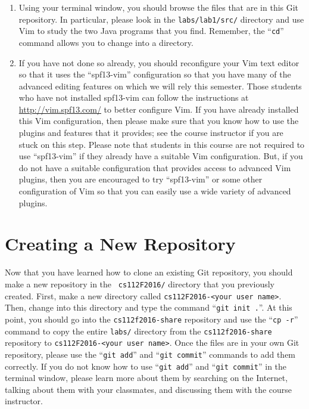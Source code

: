 \begin{enumerate}
\item Using your terminal window, you should browse the files that are in this Git repository.  In particular, please
  look in the {\tt labs/lab1/src/} directory and use Vim to study the two Java programs that you find.  Remember, the
  ``{\tt cd}'' command allows you to change into a directory.

\item If you have not done so already, you should reconfigure your Vim text editor so that it uses the ``spf13-vim''
  configuration so that you have many of the advanced editing features on which we will rely this semester. Those
  students who have not installed spf13-vim can follow the instructions at \url{http://vim.spf13.com/} to better
  configure Vim. If you have already installed this Vim configuration, then please make sure that you know how to use
  the plugins and features that it provides; see the course instructor if you are stuck on this step. Please note that
  students in this course are not required to use ``spf13-vim'' if they already have a suitable Vim configuration.
  But, if you do not have a suitable configuration that provides access to advanced Vim plugins, then you are
  encouraged to try ``spf13-vim'' or some other configuration of Vim so that you can easily use a wide variety of
  advanced plugins.

\end{enumerate}

\vspace*{-.1in}

\section*{Creating a New Repository}

Now that you have learned how to clone an existing Git repository, you should make a new repository in the {\tt
  cs112F2016/} directory that you previously created.  First, make a new directory called {\tt cs112F2016-<your user
name>}. Then, change into this directory and type the command ``{\tt git init .}''.  At this point, you should go into
the {\tt cs112f2016-share} repository and use the ``{\tt cp -r}'' command to copy the entire {\tt labs/} directory from
the {\tt cs112f2016-share} repository to {\tt cs112F2016-<your user name>}.  Once the files are in your own Git
repository, please use the ``{\tt git add}'' and ``{\tt git commit}'' commands to add them correctly. If you do not know
how to use ``{\tt git add}'' and ``{\tt git commit}'' in the terminal window, please learn more about them by searching
on the Internet, talking about them with your classmates, and discussing them with the course instructor.

